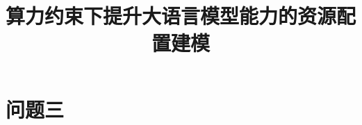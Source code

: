 \documentclass[bwprint,withoutpreface]{gmcmthesis}
\title{算力约束下提升大语言模型能力的资源配置建模}
\begin{document}
\maketitle
\begin{abstract}

\end{abstract}
\maketoc
\clearpage





\section{问题三}







\end{document}
